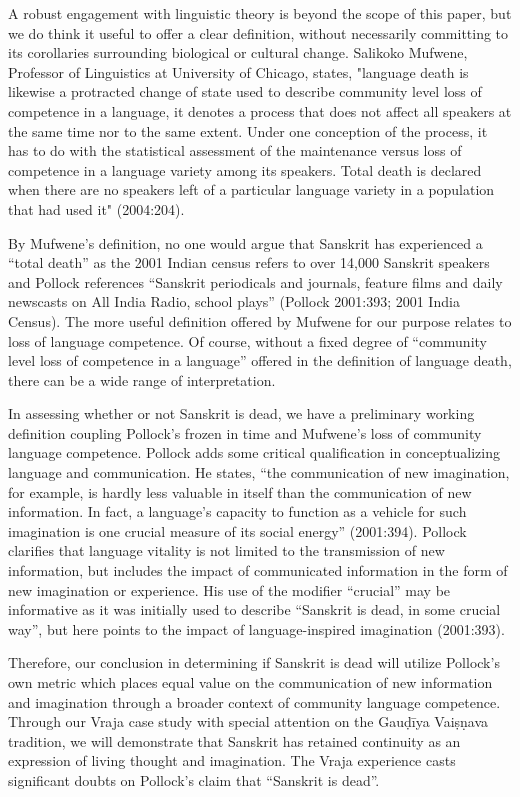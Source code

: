 A robust engagement with linguistic theory is beyond the scope of this paper, but we do think it useful to offer a clear definition, without necessarily committing to its corollaries surrounding biological or cultural change. Salikoko Mufwene, Professor of Linguistics at University of Chicago, states, "language death is likewise a protracted change of state used to describe community level loss of competence in a language, it denotes a process that does not affect all speakers at the same time nor to the same extent. Under one conception of the process, it has to do with the statistical assessment of the maintenance versus loss of competence in a language variety among its speakers. Total death is declared when there are no speakers left of a particular language variety in a population that had used it" (2004:204). 

By Mufwene’s definition, no one would argue that Sanskrit has experienced a “total death” as the 2001 Indian census refers to over 14,000 Sanskrit speakers and Pollock references “Sanskrit periodicals and journals, feature films and daily newscasts on All India Radio, school plays” (Pollock 2001:393; 2001 India Census). The more useful definition offered by Mufwene for our purpose relates to loss of language competence. Of course, without a fixed degree of “community level loss of competence in a language” offered in the definition of language death, there can be a wide range of interpretation. 

In assessing whether or not Sanskrit is dead, we have a preliminary working definition coupling Pollock’s frozen in time and Mufwene’s loss of community language competence. Pollock adds some critical qualification in conceptualizing language and communication. He states, “the communication of new imagination, for example, is hardly less valuable in itself than the communication of new information. In fact, a language’s capacity to function as a vehicle for such imagination is one crucial measure of its social energy” (2001:394). Pollock clarifies that language vitality is not limited to the transmission of new information, but includes the impact of communicated information in the form of new imagination or experience. His use of the modifier “crucial” may be informative as it was initially used to describe “Sanskrit is dead, in some crucial way”, but here points to the impact of language-inspired imagination (2001:393). 

Therefore, our conclusion in determining if Sanskrit is dead will utilize Pollock’s own metric which places equal value on the communication of new information and imagination through a broader context of community language competence. Through our Vraja case study with special attention on the Gauḍīya Vaiṣṇava tradition, we will demonstrate that Sanskrit has retained continuity as an expression of living thought and imagination. The Vraja experience casts significant doubts on Pollock’s claim that “Sanskrit is dead”. 

